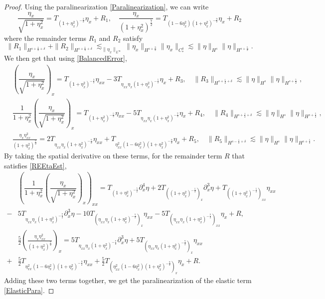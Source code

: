 \documentclass[12pt]{amsart}
\theoremstyle{definition}
\numberwithin{equation}{section}
\newcommand{\p}{\partial}
\newcommand{\f}{\frac}
\begin{document}
\begin{proof}
Using the paralinearization \eqref{Paralinearization}, we can write
\begin{equation*}
\dfrac{\eta_x}{\sqrt{1+\eta_x^2}} =  T_{(1+\eta_x^2)^{-\f32}} \eta_x + R_1, \quad \dfrac{\eta_x}{(1+\eta_x^2)^\f72} =  T_{(1-6\eta_x^2)(1+\eta_x^2)^{-\f92}} \eta_x + R_2
\end{equation*}
where the remainder terms $R_1$ and $R_2$ satisfy
\begin{equation*}
 \|R_1\|_{H^{s+\f12 + \delta}} + \|R_2\|_{H^{s+\f12 + \delta}}\lesssim_{\|\eta_x\|_{L^\infty}} \| \eta_x\|_{H^{s+\f32}} \|\eta_x\|_{C^\delta_*} \lesssim \|\eta\|_{H^s} \| \eta\|_{H^{s+\f52}}.
\end{equation*}
We then get that using \eqref{BalancedError},
\begin{align*}
 &\left(\dfrac{\eta_x}{\sqrt{1+\eta_x^2}}\right)_x = T_{(1+\eta_x^2)^{-\f32}} \eta_{xx} -3T_{\eta_{xx}\eta_x(1+\eta_x^2)^{-\f52}} \eta_{x} + R_3, \quad \|R_3\|_{H^{s+\f12 + \delta}}\lesssim \|\eta\|_{H^s} \| \eta\|_{H^{s+\f52}}, \\
 &\dfrac{1}{1+\eta_x^2}\left(\dfrac{\eta_x}{\sqrt{1+\eta_x^2}}\right)_x = T_{(1+\eta_x^2)^{-\f52}} \eta_{xx} -5T_{\eta_{xx}\eta_x(1+\eta_x^2)^{-\f72}} \eta_{x} + R_4, \quad \|R_4\|_{H^{s+\f12 + \delta}}\lesssim \|\eta\|_{H^s} \| \eta\|_{H^{s+\f52}}, \\
 &\f{\eta_x\eta_{xx}^2}{(1+\eta^2_x)^{\f72}} = 2T_{\eta_{xx}\eta_x(1+\eta_x^2)^{-\f72}}\eta_{xx} + T_{\eta_{xx}^2(1-6\eta_x^2)(1+\eta_x^2)^{-\f92}} \eta_x + R_5, \quad \|R_5\|_{H^{s-\f12 + \delta}}\lesssim \|\eta\|_{H^s} \| \eta\|_{H^{s+\f52}}.
\end{align*}
By taking the spatial derivative on these terms, for the remainder term $R$ that satisfies \eqref{REEtaEst},
\begin{align*}
    &\left( \dfrac{1}{1+\eta_x^2}\left(\dfrac{\eta_x}{\sqrt{1+\eta_x^2}}\right)_x\right)_{xx} = T_{(1+\eta_x^2)^{-\f52}} \p_x^4\eta + 2T_{((1+\eta_x^2)^{-\f52})_x} \p_x^3\eta + T_{((1+\eta_x^2)^{-\f52})_{xx}} \eta_{xx}\\
    -&5T_{\eta_{xx}\eta_x(1+\eta_x^2)^{-\f72}} \p_x^3\eta -10T_{(\eta_{xx}\eta_x(1+\eta_x^2)^{-\f72})_x} \eta_{xx} -5T_{(\eta_{xx}\eta_x(1+\eta_x^2)^{-\f72})_{xx}} \eta_x + R, \\
    &\f52\left(\f{\eta_x\eta_{xx}^2}{(1+\eta^2_x)^{\f72}}\right)_x = 5T_{\eta_{xx}\eta_x(1+\eta_x^2)^{-\f72}}\p_x^3\eta + 5T_{(\eta_{xx}\eta_x(1+\eta_x^2)^{-\f72})_x}\eta_{xx}\\
    +& \f52 T_{\eta_{xx}^2(1-6\eta_x^2)(1+\eta_x^2)^{-\f92}} \eta_{xx}  + \f52 T_{(\eta_{xx}^2(1-6\eta_x^2)(1+\eta_x^2)^{-\f92})_x} \eta_{x} + R.
\end{align*}
Adding these two terms together, we get the paralinearization of the elastic term \eqref{ElasticPara}.
\end{proof}
\end{document}
